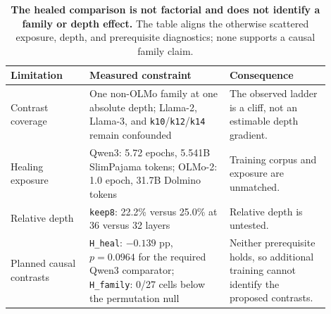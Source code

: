 \begin{table}[H]
\centering
\small
\setlength{\tabcolsep}{4pt}
\begin{tabular}{>{\raggedright\arraybackslash}p{0.22\linewidth} >{\raggedright\arraybackslash}p{0.39\linewidth} >{\raggedright\arraybackslash}p{0.29\linewidth}}
\toprule
Limitation & Measured constraint & Consequence \\
\midrule
Contrast coverage & One non-OLMo family at one absolute depth; Llama-2, Llama-3, and \texttt{k10}/\texttt{k12}/\texttt{k14} remain confounded & The observed ladder is a cliff, not an estimable depth gradient. \\
Healing exposure & Qwen3: 5.72 epochs, 5.541B SlimPajama tokens; OLMo-2: 1.0 epoch, 31.7B Dolmino tokens & Training corpus and exposure are unmatched. \\
Relative depth & \texttt{keep8}: 22.2\% versus 25.0\% at 36 versus 32 layers & Relative depth is untested. \\
Planned causal contrasts & \texttt{H\_heal}: $-0.139$ pp, $p=0.0964$ for the required Qwen3 comparator; \texttt{H\_family}: 0/27 cells below the permutation null & Neither prerequisite holds, so additional training cannot identify the proposed contrasts. \\
\bottomrule
\end{tabular}
\caption{\textbf{The healed comparison is not factorial and does not identify a family or depth effect.} The table aligns the otherwise scattered exposure, depth, and prerequisite diagnostics; none supports a causal family claim.}
\label{tab:limitations-audit}
\end{table}
